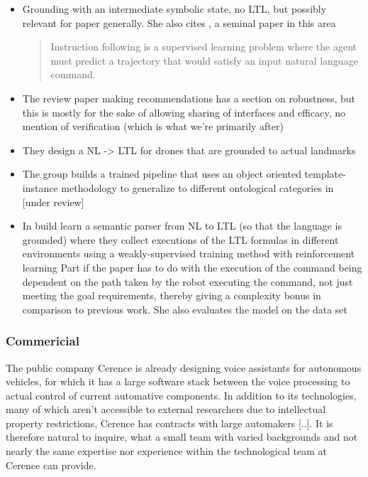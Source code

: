 \documentclass{article}
\begin{document}
\begin{itemize}

\item Grounding with an intermediate symbolic state, no LTL, but possibly
 relevant for paper generally. She also cites \cite{walkTalk}, a seminal paper in this area
\begin{quote}
Instruction following is a supervised learning problem
where the agent must predict a trajectory that would satisfy an
input natural language command. \cite{tellexInstr}
\end{quote}
\item The review paper \cite{MARGE2022101255} making recommendations has a
 section on robustness, but this is mostly for the sake of allowing sharing of
 interfaces and efficacy, no mention of verification (which is what we're
 primarily after)
\item They design a NL -> LTL for drones that are grounded to actual landmarks \cite{9197068}
\item The group builds a trained pipeline that uses an object oriented
 template-instance methodology to generalize to different ontological
 categories in  \cite{hsiung2021generalizing} [under review]

\item In \cite{patellearning} build learn a semantic parser from NL to LTL (so
that the language is grounded) where they collect executions of the LTL formulas
in different environments using a weakly-supervised training method with
reinforcement learning Part if the paper has to do with the execution of the
command being dependent on the path taken by the robot executing the command,
not just meeting the goal requirements, thereby giving a complexity bonus in
comparison to previous work. She also evaluates the model on the \cite{walkTalk}
data set
\end{itemize}

\subsubsection{Commericial}

The public company Cerence \cite{} is already designing voice assistants for autonomous
vehicles, for which it has a large software stack between the voice processing
to actual control of current automative components. In addition to its
technologies, many of which aren't accessible to external researchers due to
intellectual property restrictions, Cerence has contracts with large automakers
[..]. It is therefore natural to inquire, what a small team with varied
backgrounds and not nearly the same expertise nor experience within the
technological team at Cerence can provide.
\end{document}
